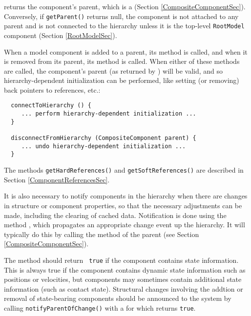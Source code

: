 \documentclass{article}
\begin{document}
 returns the component's
parent, which is a  (Section
\ref{CompositeComponentSec}). Conversely, if {\tt getParent()} returns
null, the component is not attached to any parent and is not connected
to the hierarchy unless it is the top-level {\tt RootModel} component
(Section \ref{RootModelSec}).

When a model component is added to a parent, its method
 is called, and when
it is removed from its parent, its method
 is called.
When either of these methods are called, the component's parent
(as returned by )
will be valid, and so hierarchy-dependent initialization
can be performed, like setting (or removing) back pointers to references, etc.:
\begin{lstlisting}
  connectToHierarchy () {
     ... perform hierarchy-dependent initialization ...
  }

  disconnectFromHierarchy (CompositeComponent parent) {
     ... undo hierarchy-dependent initialization ...
  }
\end{lstlisting}

The methods {\tt getHardReferences()} and {\tt getSoftReferences()}
are described in Section \ref{ComponentReferencesSec}.
 
It is also necessary to notify components in the hierarchy when there
are changes in structure or component properties, so that the
necessary adjustments can be made, including the clearing of cached
data. Notification is done using the method
, which propagates
an appropriate change event up the hierarchy. It will typically do
this by calling the
 method of the
parent (see Section \ref{CompositeComponentSec}).

The method  should return {\tt
true} if the component contains state information. This is always true
if the component contains dynamic state information such as positions
or velocities, but components may sometimes contain additional state
information (such as contact state). Structural changes
involving the addtion or removal of state-bearing components should be
announced to the system by calling {\tt notifyParentOfChange()} with a
 for which
 returns {\tt true}.
\end{document}
